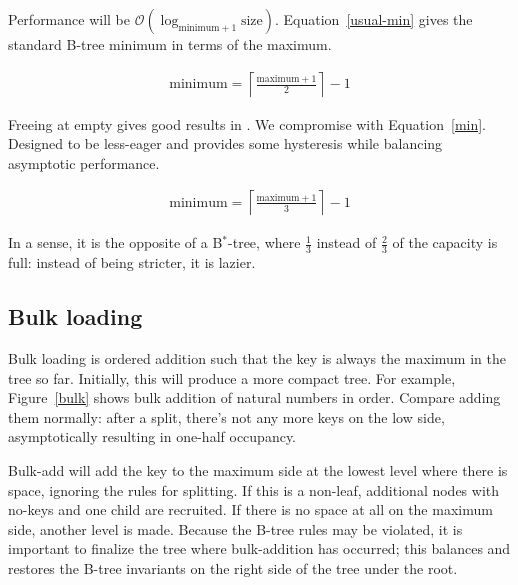 \documentclass[12pt]{article}
\begin{document}
Performance will be
$\mathcal{O}(\log_{\text{minimum}+1} \text{size})$. Equation~\ref{usual-min} gives the standard B-tree minimum in terms of the maximum.

\begin{align}
\text{minimum} = \left\lceil \frac{\text{maximum}+1}{2} \right\rceil - 1 \label{usual-min}
\end{align}

Freeing at empty gives good results in \cite{johnson1993b}. We compromise with Equation~\ref{min}. Designed to be less-eager and provides some hysteresis while balancing asymptotic performance.

\begin{align}
\text{minimum} = \left\lceil \frac{\text{maximum}+1}{3} \right\rceil - 1 \label{min}
\end{align}

In a sense, it is the opposite of a B$^*$-tree\cite{knuth1998sorting, douglas1979ubiquitous}, where $\frac{1}{3}$ instead of $\frac{2}{3}$ of the capacity is full: instead of being stricter, it is lazier.

\subsection{Bulk loading}

Bulk loading is ordered addition such that the key is always the maximum in the tree so far. Initially, this will produce a more compact tree. For example, Figure~\ref{bulk} shows bulk addition of natural numbers in order. Compare adding them normally: after a split, there's not any more keys on the low side, asymptotically resulting in one-half occupancy.

Bulk-add will add the key to the maximum side at the lowest level where there is space, ignoring the rules for splitting. If this is a non-leaf, additional nodes with no-keys and one child are recruited. If there is no space at all on the maximum side, another level is made. Because the B-tree rules may be violated, it is important to finalize the tree where bulk-addition has occurred; this balances and restores the B-tree invariants on the right side of the tree under the root.
\end{document}
